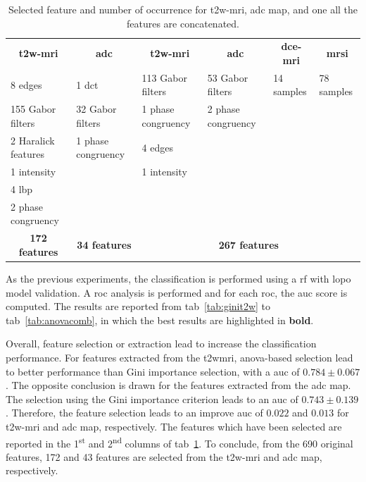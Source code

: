 \begin{landscape}
\begin{table}
  \caption{Selected feature and number of occurrence for \acs*{t2w}-\acs*{mri}, \acs*{adc} map, and one all the features are concatenated.}
  \centering
  \scriptsize
  \begin{tabular}{llllll}
    \toprule
    \multicolumn{1}{c}{\textbf{\acs*{t2w}-\acs*{mri}}} & \multicolumn{1}{c}{\textbf{\acs*{adc}}} & \multicolumn{1}{c}{\textbf{\acs*{t2w}-\acs*{mri}}} & \multicolumn{1}{c}{\textbf{\acs*{adc}}} & \multicolumn{1}{c}{\textbf{\acs*{dce}-\acs*{mri}}} & \multicolumn{1}{c}{\textbf{\acs*{mrsi}}} \\
    \cmidrule(lr){1-1} \cmidrule(lr){2-2} \cmidrule(lr){3-6}
    8 edges & 1 \acs*{dct} & 113 Gabor filters & 53 Gabor filters & 14 samples  & 78 samples \\
    155 Gabor filters & 32 Gabor filters & 1 phase congruency & 2 phase congruency & & \\ 
    2 Haralick features & 1 phase congruency & 4 edges & & & \\
    1 intensity & & 1 intensity & & & \\
    4 \acs*{lbp} & & & & & \\
    2 phase congruency & & & & & \\
    \cmidrule(lr){1-1} \cmidrule(lr){2-2} \cmidrule(lr){3-6}
    \multicolumn{1}{c}{\textbf{172 features}} & \multicolumn{1}{c}{\textbf{34 features}} & \multicolumn{4}{c}{\textbf{267 features}} \\
    \bottomrule
  \end{tabular}
  \label{tab:selfeatocc}
\end{table}

\end{landscape}

As the previous experiments, the classification is performed using a \ac{rf} with \ac{lopo} model validation.
A \ac{roc} analysis is performed and for each \ac{roc}, the \ac{auc} score is computed.
The results are reported from \acs{tab}~\ref{tab:ginit2w} to \acs{tab}~\ref{tab:anovacomb}, in which the best results are highlighted in \textbf{bold}.

Overall, feature selection or extraction lead to increase the classification performance.
For features extracted from the \ac{t2w}\ac{mri}, \ac{anova}-based selection lead to better performance than Gini importance selection, with a \ac{auc} of $0.784 \pm 0.067$.
The opposite conclusion is drawn for the features extracted from the \ac{adc} map.
The selection using the Gini importance criterion leads to an \ac{auc} of $0.743 \pm 0.139$.
Therefore, the feature selection leads to an improve \ac{auc} of $0.022$ and $0.013$ for \ac{t2w}-\ac{mri} and \ac{adc} map, respectively.
The features which have been selected are reported in the 1\textsuperscript{st} and 2\textsuperscript{nd} columns of \acs{tab}~\ref{tab:selfeatocc}.
To conclude, from the 690 original features, 172 and 43 features are selected from the \ac{t2w}-\ac{mri} and \ac{adc} map, respectively.

